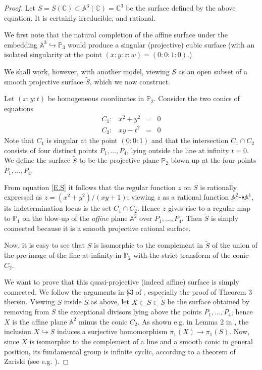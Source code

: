 \documentclass[leqno,12pt]{article} %
\def\A{{{\mathbb A}}}
\def\C{{{\mathbb C}}}
\def\P{{{\mathbb P}}}
\theoremstyle{plain} %
\theoremstyle{definition} %
\begin{document}
\begin{proof}
Let $S=S(\C)\subset \A^3(\C)=\C^3$ be the surface defined by the above equation. It is certainly irreducible, and rational.

We first note that the natural completion of the affine surface under the embedding $\A^3\hookrightarrow \P_3$ would produce a singular (projective) cubic surface (with an isolated singularity at the point $(x:y:z:w)=(0:0:1:0)$.) 

 We shall work, however, with another model, viewing $S$ as an open subset of a smooth  projective surface $\tilde{S}$, which we now construct.
 
 
Let $(x:y:t)$ be homogeneous coordinates in $\P_2$. Consider the two conics of equations
\begin{equation*}
\begin{matrix}
C_1: & x^2+y^2&=&0\\
C_2: & xy-t^2 &=& 0
\end{matrix}
\end{equation*}
Note that $C_1$ is singular at the point $(0:0:1)$ and that the intersection $C_1\cap C_2$ consists of four distinct  points $P_1,\ldots,P_4$, lying outside the line at infinity $t=0$. 
 We define the surface $\tilde{S}$ to be the projective plane $\P_2$ blown up at the four points $P_1,\ldots,P_4$. 

From equation \eqref{E.S} it follows that the regular function $z$ on $S$ is rationally expressed as $z=(x^2+y^2)/(xy+1)$; viewing $z$ as a rational function   $\A^2\dashrightarrow \A^1$, its indetermination locus is the set  $C_1\cap C_2$. Hence $z$  gives rise to  a regular map  to $\P_1$ on the blow-up of the {\it affine} plane $\A^2$ over $P_1,\ldots,P_4$. 
Then $\tilde{S}$ is simply connected because it is a smooth projective rational surface.

Now, it is easy to see that $S$ is isomorphic to the complement in $\tilde{S}$ of the union of the pre-image of the line at infinity in $\P_2$ with the strict transform of the conic $C_2$. 

We want to prove that this quasi-projective (indeed affine) surface is simply connected. We follow the arguments in \S 3 of \cite{CZadv}, especially the proof of Theorem 3 therein. Viewing $S$ inside $\tilde{S}$ as above, let $X\subset S\subset \tilde{S}$ be  the surface obtained by removing from $S$ the exceptional divisors lying above the points $P_1,\ldots,P_4$, hence $X$ is the affine plane $\A^2$ minus the conic $C_2$. As shown e.g. in Lemma 2 in \cite{CZadv}, the inclusion $X\hookrightarrow S$ induces a surjective homomorphism $\pi_1(X)\rightarrow \pi_1(S)$. Now, since $X$ is isomorphic to the complement of a line and a smooth conic in general position, its fundamental group is infinite cyclic, according to a theorem of Zariski (see e.g. \cite{SeBourbaki}). 


\end{proof}
\end{document}
